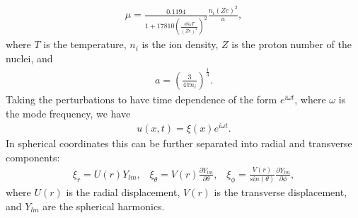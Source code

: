 \documentclass[fleqn,usenatbib]{mnras}
\begin{document}
~\citet{strohmayer1991shear}
\begin{align}
\mu=\frac{0.1194}{1+17810\left(\frac{ak_bT}{\left(Ze\right)^2}\right)^2}\frac{n_i\left(Ze\right)^2}{a},
\label{eq:mu_1991}
\end{align}
\noindent where $T$ is the temperature, $n_i$ is the ion density, $Z$ is the proton number of the nuclei, and 
\begin{align}
a=\left(\frac{3}{4\pi n_i}\right)^{\frac{1}{3}}.
\label{eq:mu_1991_a}
\end{align}
Taking the perturbations to have time dependence of the form $e^{i\omega t}$, where $\omega$ is the mode frequency, we have 
\begin{align}
u(x,t)=\xi(x)e^{i\omega t}.
\label{eq:time_seperation}
\end{align}
\noindent In spherical coordinates this can be further separated into radial and transverse components:
\begin{align}
\xi_r=U(r)Y_{lm},\;\;\;\xi_{\theta}=V(r)\frac{\partial Y_{lm}}{\partial\theta},\;\;\;\xi_{\phi}=\frac{V(r)}{sin(\theta)}\frac{\partial Y_{lm}}{\partial\phi},
\label{eq:xi_seperation}
\end{align}
\noindent where $U(r)$ is the radial displacement, $V(r)$ is the transverse displacement, and $Y_{lm}$ are the spherical harmonics.
\end{document}
